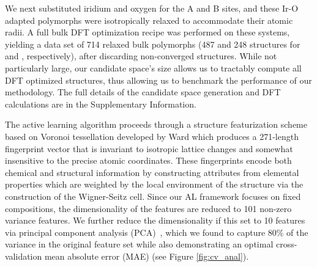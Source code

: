 %
We next substituted iridium and oxygen for the A and B sites, and these Ir-O adapted polymorphs were isotropically relaxed to accommodate their atomic radii.
%
A full bulk DFT optimization recipe was performed on these systems,
yielding a data set of \num{714} relaxed bulk \IrOx polymorphs
(\num{487} and \num{248} structures for \IrOtwo and \IrOthree, respectively),
after discarding  non-converged structures.
%
While not particularly large, our candidate space's size allows us to tractably compute all DFT optimized structures, thus allowing us to benchmark the performance of our methodology.
%
The full details of the candidate space generation and DFT calculations are in the Supplementary Information.


%
The active learning algorithm proceeds through a structure featurization scheme based on Voronoi tessellation developed by Ward  \cite{Ward2017} which produces a \num{271}-length fingerprint vector that is invariant to isotropic lattice changes and somewhat insensitive to the precise atomic coordinates.
%
These fingerprints encode both chemical and structural information by constructing attributes from elemental properties which are weighted by the local environment of the structure via the construction of the Wigner-Seitz cell.
\cite{Wigner1933}
%
Since our AL framework focuses on fixed compositions, the dimensionality of the features are reduced to \num{101} non-zero variance features.
%
We further reduce the dimensionality if this set to 10 features via principal component analysis (PCA)~\cite{Tipping1999},
which we found to capture 80\% of the variance in the original feature set while also demonstrating an optimal cross-validation mean absolute error (MAE) (see Figure \ref{fig:cv_anal}).
%
%


